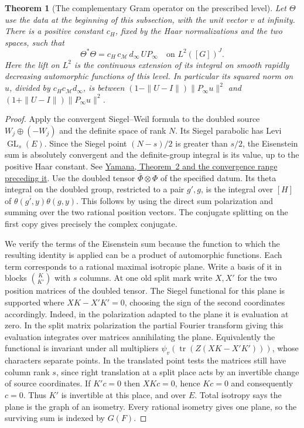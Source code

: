 \documentclass[a4paper,11pt]{article}
\newtheorem{theorem}[proposition]{Theorem}
\theoremstyle{definition}
\theoremstyle{remark}
\numberwithin{equation}{section}
\newcommand{\GL}{\operatorname{GL}}
\begin{document}
\begin{theorem}[The complementary Gram operator on the prescribed level]
\leavevmode\label{thm:complementgram812}
Let \(\Theta\) use the data at the beginning of this subsection,
with the unit vector \(v\) at infinity. There is a positive
constant \(c_H\), fixed by the Haar normalizations and the
two spaces, such that
\[
 \Theta^*\Theta=c_H\,c_{\mathcal M}\,d_\infty\, U P_\infty
                 \quad\text{on }L^2([G])^J .
\]
Here the lift on \(L^2\) is the continuous extension of its
integral on smooth rapidly decreasing automorphic functions
of this level. In particular its squared norm on \(u\), divided
by \(c_Hc_{\mathcal M}d_\infty\), is between
\((1-\|U-I\|)\|P_\infty u\|^2\) and
\((1+\|U-I\|)\|P_\infty u\|^2\).
\end{theorem}
\begin{proof}
Apply the convergent Siegel--Weil formula to the doubled
source \(W_j\oplus(-W_j)\) and the definite space of rank
\(N\). Its Siegel parabolic has Levi \(\GL_s(E)\).
Since the Siegel point \((N-s)/2\) is greater than \(s/2\),
the Eisenstein sum is absolutely convergent and the
definite-group integral is its value, up to the positive
Haar constant. See
\href{https://msp.org/pjm/2013/264-1/pjm-v264-n1-p11-s.pdf}
{Yamana, Theorem~2 and the convergence range preceding it}.
Use the doubled tensor \(\bar\Phi\otimes\Phi\) of the
specified datum. Its theta integral on the doubled group,
restricted to a pair \(g',g\), is the integral over \([H]\)
of \(\overline{\theta(g',y)}\theta(g,y)\). This follows
by using the direct sum polarization and summing over the
two rational position vectors. The conjugate splitting
on the first copy gives precisely the complex conjugate.

We verify the terms of the Eisenstein sum because the
function to which the resulting identity is applied can
be a product of automorphic functions. Each term corresponds
to a rational maximal isotropic plane. Write a basis of it
in blocks \(\binom{K}{K'}\) with \(s\) columns. At one old
split mark write \(X,X'\) for the two position matrices of
the doubled tensor. The Siegel functional for this plane is
supported where \(XK-X'K'=0\), choosing the sign of the
second coordinates accordingly. Indeed, in the polarization
adapted to the plane it is evaluation at zero. In the split
matrix polarization the partial Fourier transform giving
this evaluation integrates over matrices annihilating the
plane. Equivalently the functional is invariant under all
multipliers \(\psi_v(\operatorname{tr}(Z(XK-X'K')))\),
whose characters separate points. In the
translated point tests the matrices still have column rank
\(s\), since right translation at a split place acts by
an invertible change of source coordinates. If \(K'c=0\)
then \(XKc=0\), hence \(Kc=0\) and consequently \(c=0\).
Thus \(K'\) is invertible at this place, and over \(E\).
Total isotropy says the plane is the graph of an isometry.
Every rational isometry gives one plane, so the surviving
sum is indexed by \(G(F)\).


\end{proof}
\end{document}
